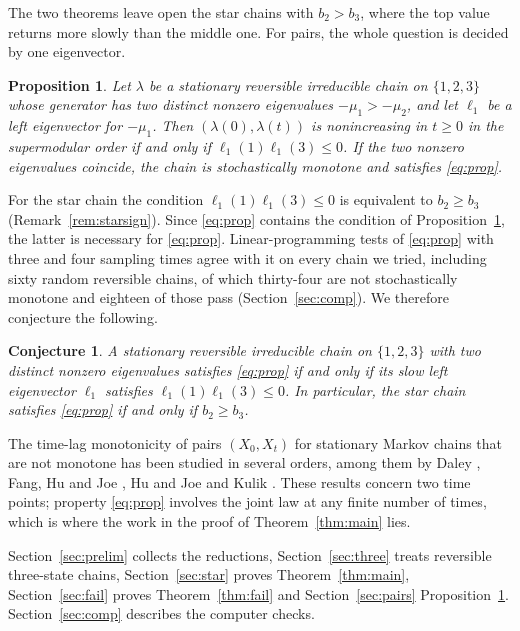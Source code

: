 \documentclass[11pt]{amsart}
\newtheorem{proposition}[theorem]{Proposition}
\newtheorem{conjecture}[theorem]{Conjecture}
\theoremstyle{remark}
\numberwithin{equation}{section}
\newcommand{\1}{\mathbf 1}
\begin{document}
The two theorems leave open the star chains with $b_2>b_3$, where the top value returns more slowly than the middle one. For pairs, the whole question is decided by one eigenvector.

\begin{proposition}\label{prop:pairs}
Let $\lambda$ be a stationary reversible irreducible chain on $\{1,2,3\}$ whose generator has two distinct nonzero eigenvalues $-\mu_1>-\mu_2$, and let $\ell_1$ be a left eigenvector for $-\mu_1$. Then $(\lambda(0),\lambda(t))$ is nonincreasing in $t\ge0$ in the supermodular order if and only if $\ell_1(1)\ell_1(3)\le0$. If the two nonzero eigenvalues coincide, the chain is stochastically monotone and satisfies \eqref{eq:prop}.
\end{proposition}

For the star chain the condition $\ell_1(1)\ell_1(3)\le0$ is equivalent to $b_2\ge b_3$ (Remark~\ref{rem:starsign}). Since \eqref{eq:prop} contains the condition of Proposition~\ref{prop:pairs}, the latter is necessary for \eqref{eq:prop}. Linear-programming tests of \eqref{eq:prop} with three and four sampling times agree with it on every chain we tried, including sixty random reversible chains, of which thirty-four are not stochastically monotone and eighteen of those pass (Section~\ref{sec:comp}). We therefore conjecture the following.

\begin{conjecture}\label{conj:three}
A stationary reversible irreducible chain on $\{1,2,3\}$ with two distinct nonzero eigenvalues satisfies \eqref{eq:prop} if and only if its slow left eigenvector $\ell_1$ satisfies $\ell_1(1)\ell_1(3)\le0$. In particular, the star chain satisfies \eqref{eq:prop} if and only if $b_2\ge b_3$.
\end{conjecture}

The time-lag monotonicity of pairs $(X_0,X_t)$ for stationary Markov chains that are not monotone has been studied in several orders, among them by Daley \cite{Dal}, Fang, Hu and Joe \cite{FHJ}, Hu and Joe \cite{HJ} and Kulik \cite{Kul}. These results concern two time points; property \eqref{eq:prop} involves the joint law at any finite number of times, which is where the work in the proof of Theorem~\ref{thm:main} lies.

Section~\ref{sec:prelim} collects the reductions, Section~\ref{sec:three} treats reversible three-state chains, Section~\ref{sec:star} proves Theorem~\ref{thm:main}, Section~\ref{sec:fail} proves Theorem~\ref{thm:fail} and Section~\ref{sec:pairs} Proposition~\ref{prop:pairs}. Section~\ref{sec:comp} describes the computer checks.
\end{document}

